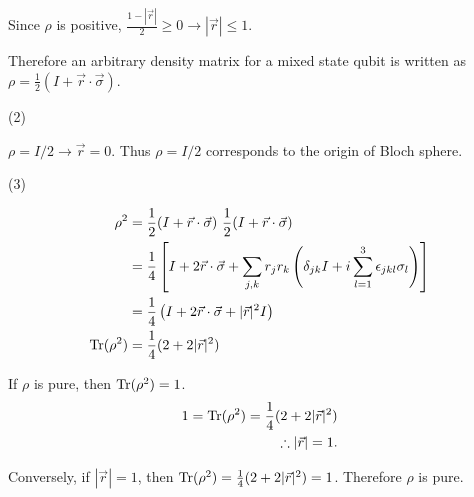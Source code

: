 Since $\rho$ is positive, $\frac{1 - |\vec{r}|}{2} \geq 0 \rightarrow |\vec{r}| \leq 1$.

Therefore an arbitrary density matrix for a mixed state qubit is written as $\rho = \frac{1}{2} (I + \vec{r} \cdot \vec{\sigma})$.

\vspace{5mm}
(2)

$\rho = I / 2 \rightarrow \vec{r}  = 0$. Thus  $\rho = I / 2$ corresponds to the origin of Bloch sphere.

\vspace{5mm}
(3)

\begin{align*}
    \rho^2 &= \frac{1}{2} (I + \vec{r} \cdot \vec{\sigma})~ \frac{1}{2} (I + \vec{r} \cdot \vec{\sigma})\\
        &= \frac{1}{4} \left[ I + 2 \vec{r}\cdot \vec{\sigma} + \sum_{j,k}r_j r_k \left(\delta_{jk} I + i \sum_{l=1}^3 \epsilon_{jkl}\sigma_l \right)  \right]\\
        &= \frac{1}{4} \left(I + 2 \vec{r}\cdot \vec{\sigma} + |\vec{r}|^2 I \right)\\
    \operatorname{Tr} (\rho^2) &= \frac{1}{4} (2 + 2|\vec{r}|^2)
\end{align*}

If $\rho$ is pure, then $\operatorname{Tr} (\rho^2) = 1$.
\begin{align*}
   1 =  \operatorname{Tr} (\rho^2) = \frac{1}{4} (2 + 2|\vec{r}|^2)\\
   \therefore |\vec{r}| = 1.
\end{align*}

Conversely, if $|\vec{r}| = 1$, then $\operatorname{Tr} (\rho^2) = \frac{1}{4} (2 + 2|\vec{r}|^2) = 1$. Therefore $\rho$ is pure.




